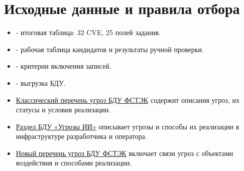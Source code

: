 \documentclass[12pt,a4paper]{report}
\begin{document}
\section*{Исходные данные и правила отбора}
\begin{itemize}
\item \href{https://github.com/quiner1793/HSE-Cybersecurity-Programming-Work1/blob/master/data/vulnerabilities_final.csv}{} - итоговая таблица: 32 CVE, 25 полей задания.
\item \href{https://github.com/quiner1793/HSE-Cybersecurity-Programming-Work1/blob/master/data/vulnerabilities.csv}{} - рабочая таблица кандидатов и результаты ручной проверки.
\item \href{https://github.com/quiner1793/HSE-Cybersecurity-Programming-Work1/blob/master/data/manual_review.md}{} - критерии включения записей.
\item \href{https://github.com/quiner1793/HSE-Cybersecurity-Programming-Work1/blob/master/data/raw/bdu_vullist.xlsx}{} - выгрузка БДУ.
\item \href{https://bdu.fstec.ru/threat}{Классический перечень угроз БДУ ФСТЭК} содержит описания угроз, их статусы и условия реализации.
\item \href{https://bdu.fstec.ru/threat/ai}{Раздел БДУ «Угрозы ИИ»} описывает угрозы и способы их реализации в инфраструктуре разработчика и оператора.
\item \href{https://bdu.fstec.ru/threat-section/threats}{Новый перечень угроз БДУ ФСТЭК} включает связи угроз с объектами воздействия и способами реализации.
\end{itemize}
\end{document}
